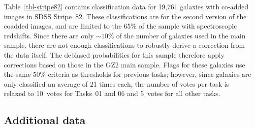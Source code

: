 \documentclass[useAMS,usenatbib]{mn2e}
\newcommand{\mr}{$M_r$}
\begin{document}
%
%
%
%



Table~\ref{tbl-stripe82} contains classification data for 19,761 galaxies with co-added images in SDSS Stripe~82. These classifications are for the second version of the coadded images, and are limited to the 65\% of the sample with spectroscopic redshifts. Since there are only $\sim10\%$ of the number of galaxies used in the main sample, there are not enough classifications to robustly derive a correction from the data itself. The debiased probabilities for this sample therefore apply corrections based on those in the GZ2 main sample. Flags for these galaxies use the same 50\% criteria as thresholds for previous tasks; however, since galaxies are only classified an average of 21 times each, the number of votes per task is relaxed to 10~votes for Tasks~01 and 06 and 5~votes for all other tasks. 

\subsection{Additional data}\label{ssec-metadata}
\end{document}
